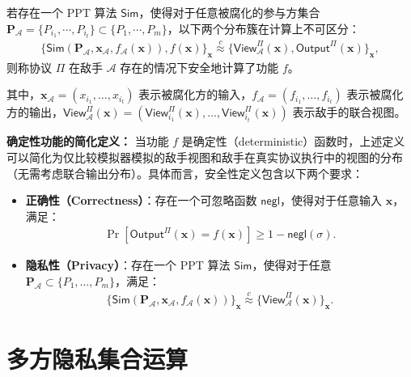 \begin{definition}[半诚实安全]\label{def:prob-secure}
若存在一个 PPT 算法 $\mathsf{Sim}$，使得对于任意被腐化的参与方集合 $\textbf{P}_{\mathcal{A}} = \{P_{i_1},\cdots,P_{i_t}\} \subset \{P_1,\cdots,P_m\}$，以下两个分布簇在计算上不可区分：
\begin{gather*}
\{\mathsf{Sim}(\textbf{P}_{\mathcal{A}},\textbf{x}_{\mathcal{A}},f_{\mathcal{A}}(\textbf{x})),f(\textbf{x})\}_{\textbf{x}} \overset{c}{\approx} \{\mathsf{View}_{\mathcal{A}}^\Pi(\textbf{x}),\mathsf{Output}^\Pi(\textbf{x})\}_{\textbf{x}},
\end{gather*}
则称协议 $\Pi$ 在敌手 $\mathcal{A}$ 存在的情况下安全地计算了功能 $f$。
\end{definition}

其中，$\textbf{x}_{\mathcal{A}} = (x_{i_1}, \dots, x_{i_t})$ 表示被腐化方的输入，$f_{\mathcal{A}} = (f_{i_1}, \dots, f_{i_t})$ 表示被腐化方的输出，$\mathsf{View}_{\mathcal{A}}^\Pi(\textbf{x}) = (\mathsf{View}_{i_1}^\Pi(\textbf{x}), \dots, \mathsf{View}_{i_t}^\Pi(\textbf{x}))$ 表示敌手的联合视图。

\begin{trivlist}
\item \textbf{确定性功能的简化定义：} 当功能 $f$ 是确定性（deterministic）函数时，上述定义可以简化为仅比较模拟器模拟的敌手视图和敌手在真实协议执行中的视图的分布（无需考虑联合输出分布）。具体而言，安全性定义包含以下两个要求：
\begin{itemize}
    \item \textbf{正确性（Correctness）}：存在一个可忽略函数 $\mathsf{negl}$，使得对于任意输入 $\textbf{x}$，满足：
    \begin{gather*}
         \Pr[\mathsf{Output}^\Pi(\textbf{x}) = f(\textbf{x})] \ge 1 - \mathsf{negl}(\sigma).
    \end{gather*}
    \item \textbf{隐私性（Privacy）}：存在一个 PPT 算法 $\mathsf{Sim}$，使得对于任意 $\textbf{P}_{\mathcal{A}} \subset \{P_1, \dots, P_m\}$，满足：
    \begin{gather*}
        \{\mathsf{Sim}(\textbf{P}_{\mathcal{A}}, \textbf{x}_{\mathcal{A}}, f_{\mathcal{A}}(\textbf{x}))\}_{\textbf{x}} \overset{c}{\approx} \{\mathsf{View}_{\mathcal{A}}^\Pi(\textbf{x})\}_{\textbf{x}}.
    \end{gather*}
\end{itemize}
\end{trivlist}

\section{多方隐私集合运算}

